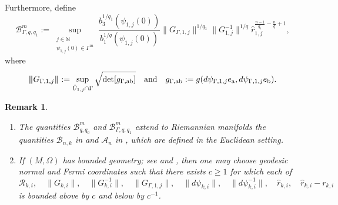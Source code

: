 \documentclass[reqno, 11pt, a4paper]{amsart}
\newtheorem{remark}[theorem]{Remark}
\numberwithin{equation}{section}
\newcommand{\gij}{\textnormal{a}  \textnormal{b}}
\newcommand{\kp}{\mathscr{R}}
\newcommand{\qxp}{q}
\newcommand{\bnorm}{\boldsymbol{\|}}
\begin{document}
Furthermore, define
\begin{equation*}
\mathcal B_{\Gamma,\qxp,\qxp_1}^m
:=
\sup_{\substack{j\in\mathbb N\\ \psi_{1,j}(0)\in\Gamma^m}}
\frac{b_3^{1/\qxp_1}(\psi_{1,j}(0))}{b_1^{1/\qxp}(\psi_{1,j}(0))}
\bnorm G_{\Gamma,1,j}\bnorm^{1/\qxp_1}
\bnorm G_{1,j}^{-1}\bnorm^{1/\qxp}
\hat r_{1,j}^{\frac{n-1}{\qxp_1}-\frac n{\qxp}+1},
\end{equation*}
where
\[
{ 
\bnorm G_{\Gamma,1,j}\bnorm
:=
\sup_{\hat U_{1,j}\cap\Gamma}\sqrt{\det[g_{\Gamma,\gij}]}
}
\quad\text{and}\quad
g_{\Gamma,\gij}
:=g(d\psi_{\Gamma,1,j}e_{\textnormal a},d\psi_{\Gamma,1,j}e_{\textnormal b}).
\]











\begin{remark} $ $
\begin{enumerate}[label=(\roman*)] 

\item The quantities \(\mathcal B_{q,q_0}^m\) and \(\mathcal B_{\Gamma,q,q_1}^m\)  extend to Riemannian manifolds the quantities \(\mathcal B_{n,k}\) in \cite{pfluger1998compactraces} and \(\mathscr A_n\) in \cite{gruka1991weighteiii}, which are defined in the Euclidean setting.



\item If \((M,\Omega)\) has {\it bounded geometry}; see \cite[Definition 4.1]{zbMATH06237307} and \cite[Proposition 3.2]{zbMATH01606240}, then one may choose geodesic normal and Fermi coordinates such that { there exists \(c\geq1\) for which each of
\[
\kp_{k,i},\quad
\bnorm G_{k,i}\bnorm,\quad
\bnorm G_{k,i}^{-1}\bnorm,\quad
\bnorm G_{\Gamma,1,j}\bnorm,\quad
\bnorm d\psi_{k,i}\bnorm,\quad
\bnorm d\psi_{k,i}^{-1}\bnorm,\quad
\hat r_{k,i},\quad
\hat r_{k,i}-r_{k,i}
\]
is bounded above by \(c\) and below by \(c^{-1}\)}.
\end{enumerate}
\end{remark}
\end{document}
